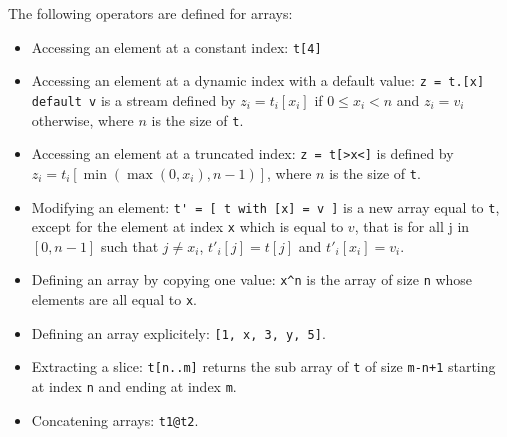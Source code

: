 \documentclass[a4paper]{article}
\begin{document}
The following operators are defined for arrays:
\begin{itemize}
\item Accessing an element at a constant index: \lstinline{t[4]}
\item Accessing an element at a dynamic index with a default value: \lstinline{z = t.[x] default v} is a stream defined by $z_i = t_i[x_i]$ if $0 \leq x_i < n$ and $z_i = v_i$ otherwise, where $n$ is the size of \lstinline+t+.
\item Accessing an element at a truncated index: \lstinline+z = t[>x<]+ is defined by $z_i = t_i[\min(\max(0, x_i), n-1)]$, where $n$ is the size of \lstinline+t+.
\item Modifying an element: \lstinline{t' = [ t with [x] = v ]} is a new array equal to \lstinline+t+, except for the element at index \lstinline+x+ which is equal to $v$, that is for all j in $[0, n-1]$ such that $j \neq x_i$, $t'_i[j] = t[j]$ and $t'_i[x_i] = v_i$.
\item Defining an array by copying one value: \lstinline+x^n+ is the array of size \lstinline+n+ whose elements are all equal to \lstinline+x+.
\item Defining an array explicitely:  \lstinline+[1, x, 3, y, 5]+.
\item Extracting a slice: \lstinline+t[n..m]+ returns the sub array of \lstinline+t+ of size \lstinline{m-n+1} starting at index \lstinline+n+ and ending at index \lstinline+m+.
\item Concatening arrays: \lstinline+t1@t2+.
\end{itemize}
\end{document}
